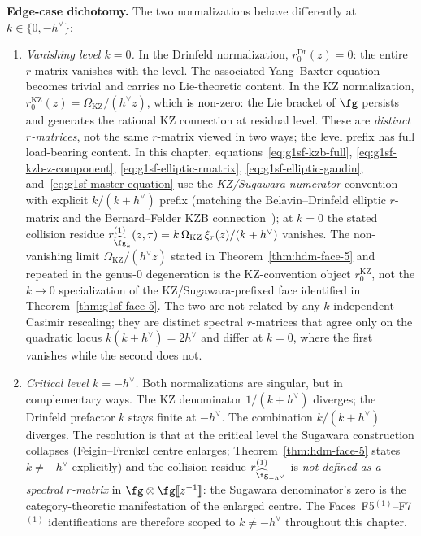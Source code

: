 \begin{lemma}
\noindent
\textbf{Edge-case dichotomy.} The two normalizations behave differently
at $k \in \{0, -h^\vee\}$:
\begin{enumerate}[label=\textup{(\alph*)}]
\item \emph{Vanishing level $k = 0$.} In the Drinfeld
normalization, $r^{\mathrm{Dr}}_0(z) = 0$: the entire $r$-matrix
vanishes with the level. The associated Yang--Baxter equation becomes
trivial and carries no Lie-theoretic content. In the KZ
normalization, $r^{\mathrm{KZ}}_0(z) = \Omega_{\mathrm{KZ}}/(h^\vee z)$,
which is non-zero: the Lie bracket of $\fg$ persists and generates
the rational KZ connection at residual level. These are
\emph{distinct $r$-matrices}, not the same $r$-matrix viewed in two
ways; the level prefix has full load-bearing content. In this chapter,
equations~\eqref{eq:g1sf-kzb-full},
\textup{\eqref{eq:g1sf-kzb-z-component}},
\textup{\eqref{eq:g1sf-elliptic-rmatrix}},
\textup{\eqref{eq:g1sf-elliptic-gaudin}},
and~\eqref{eq:g1sf-master-equation} use the \emph{KZ/Sugawara
numerator} convention with explicit $k/(k+h^\vee)$ prefix
\textup{(}matching the Belavin--Drinfeld elliptic $r$-matrix and the
Bernard--Felder KZB connection~\cite{Bernard88}\textup{)}; at $k=0$
the stated collision residue $r^{(1)}_{\widehat{\fg}_k}(z,\tau)
= k\,\Omega_{\mathrm{KZ}}\,\xi_\tau(z)/(k+h^\vee)$ vanishes.
The non-vanishing limit $\Omega_{\mathrm{KZ}}/(h^\vee z)$ stated in
Theorem~\ref{thm:hdm-face-5} and repeated in the genus-$0$
degeneration is the KZ-convention object $r^{\mathrm{KZ}}_0$, not the
$k\to 0$ specialization of the KZ/Sugawara-prefixed face identified
in Theorem~\ref{thm:g1sf-face-5}. The two are not related by any
$k$-independent Casimir rescaling; they are distinct spectral
$r$-matrices that agree only on the quadratic locus
$k(k+h^\vee) = 2h^\vee$ and differ at $k=0$, where the first
vanishes while the second does not.
\item \emph{Critical level $k = -h^\vee$.} Both normalizations
are singular, but in complementary ways. The KZ denominator
$1/(k+h^\vee)$ diverges; the Drinfeld prefactor $k$ stays finite at
$-h^\vee$. The combination $k/(k+h^\vee)$ diverges. The resolution is
that at the critical level the Sugawara construction collapses
(Feigin--Frenkel centre enlarges; Theorem~\ref{thm:hdm-face-5} states
$k\neq -h^\vee$ explicitly) and the collision residue
$r^{(1)}_{\widehat{\fg}_{-h^\vee}}$ is \emph{not defined as a spectral
$r$-matrix} in $\fg \otimes \fg[\![z^{-1}]\!]$: the Sugawara
denominator's zero is the category-theoretic manifestation of the
enlarged centre. The Faces~F5$^{(1)}$--F7$^{(1)}$ identifications are
therefore scoped to $k \neq -h^\vee$ throughout this chapter.
\end{enumerate}
\end{lemma}

